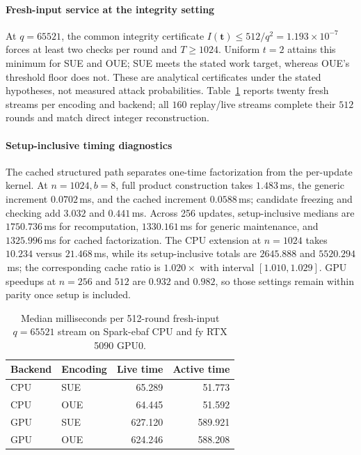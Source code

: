 \paragraph{Fresh-input service at the integrity setting}
At $q=65521$, the common integrity certificate
$I(\mathbf t)\le512/q^2=1.193\times10^{-7}$ forces at least two checks per
round and $T\ge1024$. Uniform $t=2$ attains this minimum for SUE and OUE;
SUE meets the stated work target, whereas OUE's threshold floor does not.
These are analytical certificates under the stated hypotheses, not measured
attack probabilities. Table~\ref{tab:connected-live} reports twenty fresh
streams per encoding and backend; all $160$ replay/live streams complete
their $512$ rounds and match direct integer reconstruction.

\paragraph{Setup-inclusive timing diagnostics}
The cached structured path separates one-time factorization from the
per-update kernel. At $n=1024,b=8$, full product construction takes
$1.483$\,ms, the generic increment $0.0702$\,ms, and the cached increment
$0.0588$\,ms; candidate freezing and checking add $3.032$ and $0.441$\,ms.
Across 256 updates, setup-inclusive medians are $1750.736$\,ms for
recomputation, $1330.161$\,ms for generic maintenance, and
$1325.996$\,ms for cached factorization. The CPU extension at $n=1024$
takes $10.234$ versus $21.468$\,ms, while its setup-inclusive totals are
$2645.888$ and $5520.294$\,ms; the corresponding cache ratio is
$1.020\times$ with interval $[1.010,1.029]$. GPU speedups at $n=256$
and $512$ are $0.932$ and $0.982$, so those settings remain within parity
once setup is included.

\begin{table}[t]
\caption{Median milliseconds per 512-round fresh-input $q=65521$ stream on Spark-ebaf CPU and fy RTX 5090 GPU0.}
\label{tab:connected-live}
\centering
\begin{tabular}{llrr}\toprule
Backend & Encoding & Live time & Active time\\\midrule
CPU & SUE & 65.289 & 51.773\\
CPU & OUE & 64.445 & 51.592\\
GPU & SUE & 627.120 & 589.921\\
GPU & OUE & 624.246 & 588.208\\\bottomrule
\end{tabular}
\end{table}
